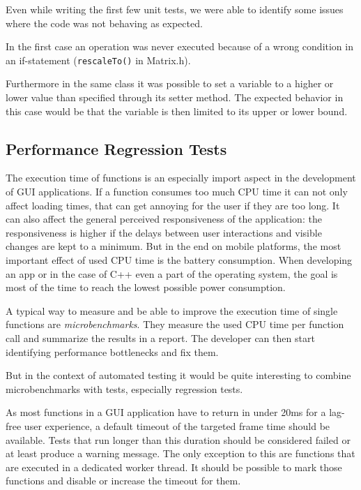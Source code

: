 \documentclass{scrreprt}
\begin{document}
Even while writing the first few unit tests, we were able to identify some issues where the code was not behaving as expected.

In the first case an operation was never executed because of a wrong condition in an if-statement (\texttt{rescaleTo()} in Matrix.h).

Furthermore in the same class it was possible to set a variable to a higher or lower value than specified through its setter method. The expected behavior in this case would be that the variable is then limited to its upper or lower bound.

\subsection{Performance Regression Tests}

The execution time of functions is an especially import aspect in the development of GUI applications. If a function consumes too much CPU time it can not only affect loading times, that can get annoying for the user if they are too long. It can also affect the general perceived responsiveness of the application: the responsiveness is higher if the delays between user interactions and visible changes are kept to a minimum. But in the end on mobile platforms, the most important effect of used CPU time is the battery consumption. When developing an app or in the case of C++ even a part of the operating system, the goal is most of the time to reach the lowest possible power consumption.

A typical way to measure and be able to improve the execution time of single functions are \textit{microbenchmarks}. They measure the used CPU time per function call and summarize the results in a report. The developer can then start identifying performance bottlenecks and fix them.

But in the context of automated testing it would be quite interesting to combine microbenchmarks with tests, especially regression tests.

As most functions in a GUI application have to return in under 20ms for a lag-free user experience, a default timeout of the targeted frame time should be available. Tests that run longer than this duration should be considered failed or at least produce a warning message. The only exception to this are functions that are executed in a dedicated worker thread. It should be possible to mark those functions and disable or increase the timeout for them.
\end{document}
